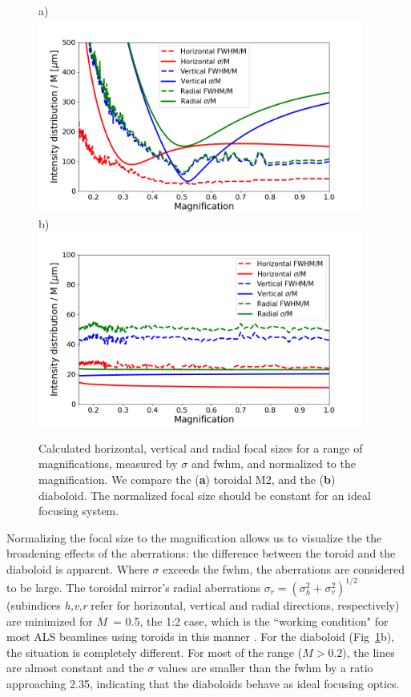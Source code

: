 \documentclass{iucr}       %
\begin{document}
\begin{figure}\label{fig:scan}
\flushleft
a)\\
\centering
\includegraphics[width=0.95\textwidth]{figures/scan_toroid.png}\\
\flushleft
b)\\
\centering
\includegraphics[width=0.95\textwidth]{figures/scan_diaboloid.png}\\
\caption{Calculated horizontal, vertical and radial focal sizes for a range of magnifications, measured by $\sigma$ and fwhm, and normalized to the magnification. We compare the (\textbf{a}) toroidal M2, and the (\textbf{b}) diaboloid. The normalized focal size should be constant for an ideal focusing system.}
\end{figure}

Normalizing the focal size to the magnification allows us to visualize the the broadening effects of the aberrations: the difference between the toroid and the diaboloid is apparent. Where $\sigma$ exceeds the fwhm, the aberrations are considered to be large. The toroidal mirror's radial aberrations $\sigma_r = (\sigma_h^2 + \sigma_v^2)^{1/2}$ (subindices {\it h,v,r} refer for horizontal, vertical and radial directions, respectively) are minimized for $M$~= 0.5, the 1:2 case, which is the ``working condition" for most ALS beamlines using toroids in this manner \cite{MacDowell2004}. For the diaboloid (Fig~\ref{fig:scan}b), the situation is completely different. For most of the range ($M > 0.2$), the lines are almost constant and the $\sigma$ values are smaller than the fwhm by a ratio approaching 2.35, indicating that the diaboloids behave as ideal focusing optics.
\end{document}
